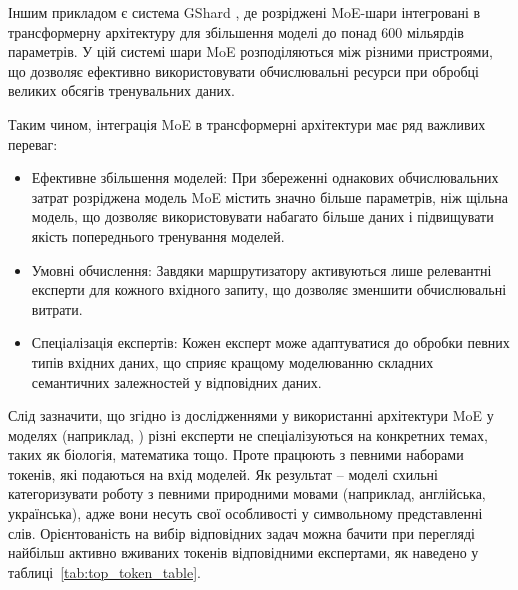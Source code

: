 Іншим прикладом є система GShard \cite{lepikhin2020gshardscalinggiantmodels}, де розріджені MoE-шари інтегровані в трансформерну архітектуру для збільшення моделі до понад 600 мільярдів параметрів. У цій системі шари MoE розподіляються між різними пристроями, що дозволяє ефективно використовувати обчислювальні ресурси при обробці великих обсягів тренувальних даних.

Таким чином, інтеграція MoE в трансформерні архітектури має ряд важливих переваг:
\begin{itemize}
    \item {Ефективне збільшення моделей}: При збереженні однакових обчислювальних затрат розріджена модель MoE містить значно більше параметрів, ніж щільна модель, що дозволяє використовувати набагато більше даних і підвищувати якість попереднього тренування моделей.
    \item {Умовні обчислення}: Завдяки маршрутизатору активуються лише релевантні експерти для кожного вхідного запиту, що дозволяє зменшити обчислювальні витрати.
    \item {Спеціалізація експертів}: Кожен експерт може адаптуватися до обробки певних типів вхідних даних, що сприяє кращому моделюванню складних семантичних залежностей у відповідних даних.
\end{itemize}

Слід зазначити, що згідно із дослідженнями у використанні архітектури MoE у моделях (наприклад, \cite{xue2024openmoeearlyeffortopen}) різні експерти не спеціалізуються на конкретних темах, таких як біологія, математика тощо. Проте працюють з певними наборами токенів, які подаються на вхід моделей. Як результат -- моделі схильні категоризувати роботу з певними природними мовами (наприклад, англійська, українська), адже вони несуть свої особливості у символьному представленні слів. Орієнтованість на вибір відповідних задач можна бачити при перегляді найбільш активно вживаних токенів відповідними експертами, як наведено у таблиці~\ref{tab:top_token_table}.

